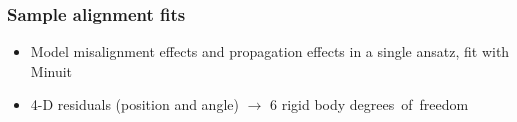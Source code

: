 \documentclass[compress]{beamer}
\begin{document}
\begin{frame}
\frametitle{Sample alignment fits}

\begin{itemize}
\item Model misalignment effects and propagation effects in a single ansatz, fit with Minuit
\item 4-D residuals (position and angle) $\to$ 6 rigid body \mbox{degrees of freedom\hspace{-1 cm}}
\end{itemize}

\begin{columns}


\end{columns}
\end{frame}
\end{document}

